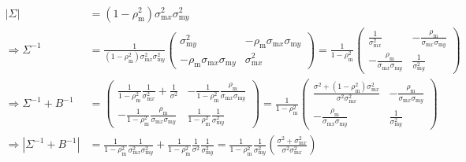 \documentclass{article}
\newcommand{\x}[1]{\text{#1}}
\begin{document}
\begin{landscape}
\begin{align*}
\end{align*}
\begin{align*}
 |\Sigma|&=(1-\rho_\x{m}^2)\sigma_{\x{m}x}^2\sigma_{\x{m}y}^2
\\ \Rightarrow \Sigma^{-1}&=\frac{1}{(1-\rho_\x{m}^2)\sigma_{\x{m}x}^2\sigma_{\x{m}y}^2}\left(\begin{array}{cc}\sigma_{\x{m}y}^2 & -\rho_\x{m}\sigma_{\x{m}x}\sigma_{\x{m}y} \\ -\rho_\x{m}\sigma_{\x{m}x}\sigma_{\x{m}y} & \sigma_{\x{m}x}^2\end{array}\right)=\frac{1}{1-\rho_\x{m}^2}\left(\begin{array}{cc}\frac{1}{\sigma_{\x{m}x}^2} & -\frac{\rho_\x{m}}{\sigma_{\x{m}x}\sigma_{\x{m}y}} \\ -\frac{\rho_\x{m}}{\sigma_{\x{m}x}\sigma_{\x{m}y}} & \frac{1}{\sigma_{\x{m}y}^2} \end{array}\right)
\\ \Rightarrow  \Sigma^{-1}+B^{-1}&=\left(\begin{array}{cc}
\frac{1}{1-\rho_\x{m}^2}\frac{1}{\sigma_{\x{m}x}^2}+\frac{1}{\sigma^2} & -\frac{1}{1-\rho_\x{m}^2}\frac{\rho_\x{m}}{\sigma_{\x{m}x}\sigma_{\x{m}y}} \\ -\frac{1}{1-\rho_\x{m}^2}\frac{\rho_\x{m}}{\sigma_{\x{m}x}\sigma_{\x{m}y}} & \frac{1}{1-\rho_\x{m}^2}\frac{1}{\sigma_{\x{m}y}^2} \end{array}\right)=\frac{1}{1-\rho_\x{m}^2}\left(\begin{array}{cc}\frac{\sigma^2+(1-\rho_\x{m}^2)\sigma_{\x{m}x}^2}{\sigma^2\sigma_{\x{m}x}^2} & -\frac{\rho_\x{m}}{\sigma_{\x{m}x}\sigma_{\x{m}y}} \\ -\frac{\rho_\x{m}}{\sigma_{\x{m}x}\sigma_{\x{m}y}} & \frac{1}{\sigma_{\x{m}y}^2} \end{array}\right)
\\ \Rightarrow |\Sigma^{-1}+B^{-1}|&=\frac{1}{1-\rho_\x{m}^2}\frac{1}{\sigma_{\x{m}x}^2\sigma_{\x{m}y}^2}+\frac{1}{1-\rho_\x{m}^2}\frac{1}{\sigma^2}\frac{1}{\sigma_{\x{m}y}^2}=\frac{1}{1-\rho_\x{m}^2}\frac{1}{\sigma_{\x{m}y}^2}\left(\frac{\sigma^2+\sigma_{\x{m}x}^2}{\sigma^2\sigma_{\x{m}x}^2}\right)

\end{align*}
\end{landscape}
\end{document}
